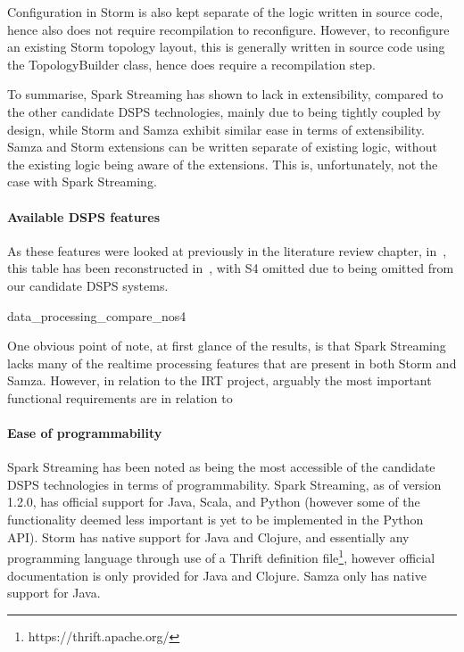 Configuration in Storm is also kept separate of the logic written in source code, hence also does not require recompilation
to reconfigure. However, to reconfigure an existing Storm topology layout, this is generally written in source code using
the TopologyBuilder class, hence does require a recompilation step.

To summarise, Spark Streaming has shown to lack in extensibility, compared to the other candidate DSPS technologies, mainly
due to being tightly coupled by design, while Storm and Samza exhibit similar ease in terms of extensibility. Samza and
Storm extensions can be written separate of existing logic, without the existing logic being aware of the extensions.
This is, unfortunately, not the case with Spark Streaming.


\paragraph{Available DSPS features}

As these features were looked at previously in the literature review chapter, in~,
this table has been reconstructed in~, with S4 omitted due to being omitted from our candidate
DSPS systems.

{data_processing_compare_nos4}

One obvious point of note, at first glance of the results, is that Spark Streaming lacks many of the realtime processing
features that are present in both Storm and Samza. However, in relation to the IRT project, arguably the most important
functional requirements are in relation to


\paragraph{Ease of programmability}

Spark Streaming has been noted as being the most accessible of the candidate DSPS technologies in terms of programmability.
Spark Streaming, as of version 1.2.0, has official support for Java, Scala, and Python (however some of the functionality deemed
less important is yet to be implemented in the Python API). Storm has native support for Java and Clojure, and essentially
any programming language through use of a Thrift definition file\footnote{https://thrift.apache.org/}, however official
documentation is only provided for Java and Clojure. Samza only has native support for Java.

